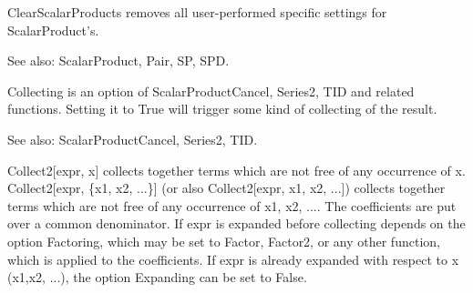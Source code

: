 

ClearScalarProducts removes all user-performed specific settings for ScalarProduct's.

See also: ScalarProduct, Pair, SP, SPD.













Collecting is an option of ScalarProductCancel, Series2, TID and related functions. Setting it to True will trigger some kind of
  collecting of the result.

See also: { }ScalarProductCancel, Series2, TID.



Collect2[expr, x] collects together terms which are not free of any occurrence of x. Collect2[expr, \{x1, x2, ...\}] (or also
  Collect2[expr, x1, x2, ...]) collects together terms which are not free of any occurrence of x1, x2, .... The coefficients are put over
  a common denominator. If expr is expanded before collecting depends on the option Factoring, which may be set to Factor, Factor2, or
  any other function, which is applied to the coefficients. If expr is already expanded with respect to x (x1,x2, ...), the option
  Expanding can be set to False.



